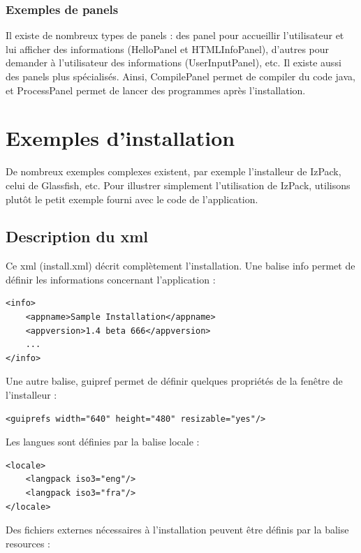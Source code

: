 \subsubsection{Exemples de panels}
Il existe de nombreux types de panels : des panel pour accueillir l'utilisateur et lui afficher des informations (HelloPanel et HTMLInfoPanel), d'autres pour demander à l'utilisateur des informations (UserInputPanel), etc.
Il existe aussi des panels plus spécialisés. Ainsi, CompilePanel permet de compiler du code java, et ProcessPanel permet de lancer des programmes après l'installation.

\section{Exemples d'installation}
De nombreux exemples complexes existent, par exemple l'installeur de IzPack, celui de Glassfish, etc. Pour illustrer simplement l'utilisation de IzPack, utilisons plutôt le petit exemple fourni avec le code de l'application.

\subsection{Description du xml}


Ce xml (install.xml) décrit complètement l'installation.
Une balise info permet de définir les informations concernant l'application : 
\begin{lstlisting}
<info>
	<appname>Sample Installation</appname>
	<appversion>1.4 beta 666</appversion>
	...
</info>
\end{lstlisting}
Une autre balise, guipref permet de définir quelques propriétés de la fenêtre de l'installeur :
\begin{lstlisting}
<guiprefs width="640" height="480" resizable="yes"/>
\end{lstlisting}
Les langues sont définies par la balise locale :
\begin{lstlisting}
<locale>
	<langpack iso3="eng"/>
	<langpack iso3="fra"/>
</locale>
\end{lstlisting}
Des fichiers externes nécessaires à l'installation peuvent être définis par la balise resources :

